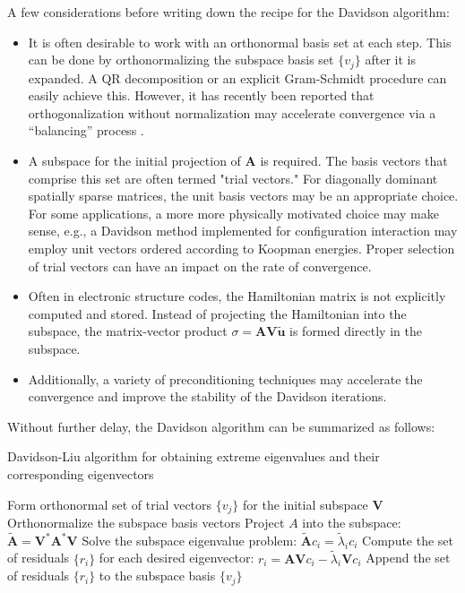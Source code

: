 \documentclass[12pt, fleqn]{article}
\begin{document}
\noindent A few considerations before writing down the recipe for the Davidson algorithm: 
\begin{itemize}
    \item It is often desirable to work with an orthonormal basis set at each step. This can be done by orthonormalizing the subspace basis set $\{v_j\}$ after it is expanded. A QR decomposition or an explicit Gram-Schmidt procedure can easily achieve this. However, it has recently been reported that orthogonalization without normalization may accelerate convergence via a ``balancing'' process \cite{Parrish2016}.
    \item A subspace for the initial projection of $\mathbf{A}$ is required. The basis vectors that comprise this set are often termed "trial vectors." For diagonally dominant spatially sparse matrices, the unit basis vectors may be an appropriate choice. For some applications, a more more physically motivated choice may make sense, e.g., a Davidson method implemented for configuration interaction may employ unit vectors ordered according to Koopman energies. Proper selection of trial vectors can have an impact on the rate of convergence.
    \item Often in electronic structure codes, the Hamiltonian matrix is not explicitly computed and stored. Instead of projecting the Hamiltonian into the subspace, the matrix-vector product $\sigma = \mathbf{A} \mathbf{V} \tilde{\mathbf{u}}$ is formed directly in the subspace. 
    \item Additionally, a variety of preconditioning techniques may accelerate the convergence and improve the stability of the Davidson iterations. 
\end{itemize}

\noindent Without further delay, the Davidson algorithm can be summarized as follows:
\begin{algorithm}
\caption{Davidson-Liu algorithm for obtaining extreme eigenvalues and their corresponding eigenvectors}
\begin{algorithmic}[1]
        \State Form orthonormal set of trial vectors $\{v_j\}$ for the initial subspace $\mathbf{V}$
            \State Orthonormalize the subspace basis vectors
            \State Project $A$ into the subspace: 
                $ \tilde{\mathbf{A}} = \mathbf{V}^* \mathbf{A}^* \mathbf{V} $
            \State Solve the subspace eigenvalue problem:
                $ \tilde{\mathbf{A}} c_i = \tilde{\lambda}_i c_i $
            \State Compute the set of residuals $\{r_i\}$ for each desired eigenvector: 
                $ r_i = \mathbf{A} \mathbf{V} c_i - \tilde{\lambda}_i \mathbf{V} c_i $
            \State Append the set of residuals $\{r_i\}$ to the subspace basis $\{v_j\}$
        \EndWhile 
    \EndProcedure
\end{algorithmic}
\end{algorithm}
\end{document}
